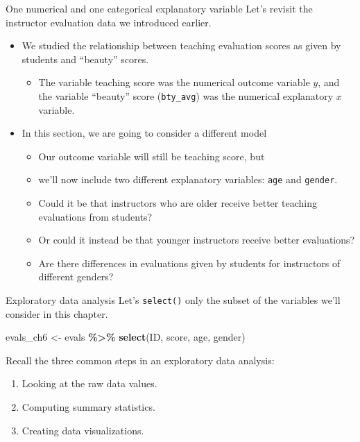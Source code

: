 \documentclass[
  ignorenonframetext,
]{beamer}
\newenvironment{Shaded}{\begin{snugshade}}{\end{snugshade}}
\newcommand{\FunctionTok}[1]{\textcolor[rgb]{0.13,0.29,0.53}{\textbf{#1}}}
\newcommand{\NormalTok}[1]{#1}
\newcommand{\OtherTok}[1]{\textcolor[rgb]{0.56,0.35,0.01}{#1}}
\newcommand{\SpecialCharTok}[1]{\textcolor[rgb]{0.81,0.36,0.00}{\textbf{#1}}}
\providecommand{\tightlist}{%
  \setlength{\itemsep}{0pt}\setlength{\parskip}{0pt}}
\begin{document}
\begin{frame}[fragile]{One numerical and one categorical explanatory
variable}
\protect\hypertarget{one-numerical-and-one-categorical-explanatory-variable}{}
Let's revisit the instructor evaluation data we introduced earlier.

\begin{itemize}
\item
  We studied the relationship between teaching evaluation scores as
  given by students and ``beauty'' scores.

  \begin{itemize}
  \tightlist
  \item
    The variable teaching score was the numerical outcome variable
    \(y\), and the variable ``beauty'' score (\texttt{bty\_avg}) was the
    numerical explanatory \(x\) variable.
  \end{itemize}
\item
  In this section, we are going to consider a different model

  \begin{itemize}
  \tightlist
  \item
    Our outcome variable will still be teaching score, but
  \item
    we'll now include two different explanatory variables: \texttt{age}
    and \texttt{gender}.
  \item
    Could it be that instructors who are older receive better teaching
    evaluations from students?
  \item
    Or could it instead be that younger instructors receive better
    evaluations?
  \item
    Are there differences in evaluations given by students for
    instructors of different genders?
  \end{itemize}
\end{itemize}
\end{frame}

\begin{frame}[fragile]{Exploratory data analysis}
\protect\hypertarget{exploratory-data-analysis-8}{}
Let's \texttt{select()} only the subset of the variables we'll consider
in this chapter.

\normalsize

\begin{Shaded}
\begin{Highlighting}[]
\NormalTok{evals\_ch6 }\OtherTok{\textless{}{-}}\NormalTok{ evals }\SpecialCharTok{\%\textgreater{}\%}
  \FunctionTok{select}\NormalTok{(ID, score, age, gender)}
\end{Highlighting}
\end{Shaded}

\normalsize

Recall the three common steps in an exploratory data analysis:

\begin{enumerate}
\tightlist
\item
  Looking at the raw data values.
\item
  Computing summary statistics.
\item
  Creating data visualizations.
\end{enumerate}
\end{frame}
\end{document}
